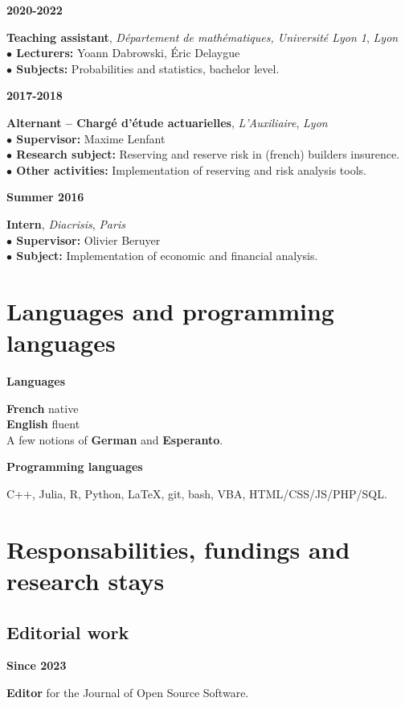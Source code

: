 \documentclass[a4paper,11pt]{article}
\newcommand{\tabcv}[2]{
\begin{minipage}[t]{0.12\linewidth}
\textbf{\footnotesize #1}
\end{minipage}\hfill
\begin{minipage}[t]{0.85\linewidth}
#2
\end{minipage}
\vspace{1em}
}
\begin{document}
\begin{flushleft}
\tabcv{2020-2022}{
\textbf{Teaching assistant}, \textit{Département de mathématiques, Université Lyon 1}, \textit{Lyon}\\[0.5em]
{\footnotesize
\textbf{$\bullet$ Lecturers:} Yoann Dabrowski, Éric Delaygue\\
\textbf{$\bullet$ Subjects:} Probabilities and statistics, bachelor level.\\
}
}

\tabcv{2017-2018}{
\textbf{Alternant -- Chargé d'étude actuarielles}, \textit{L'Auxiliaire}, \textit{Lyon}\\[0.5em]
{\footnotesize
\textbf{$\bullet$ Supervisor:} Maxime Lenfant\\
\textbf{$\bullet$ Research subject:} Reserving and reserve risk in (french) builders insurence.\\
\textbf{$\bullet$ Other activities:} Implementation of reserving and risk analysis tools.\\
}
}


\tabcv{Summer 2016}{
\textbf{Intern}, \textit{Diacrisis}, \textit{Paris}\\[0.5em]
{\footnotesize
\textbf{$\bullet$ Supervisor:} Olivier Beruyer\\
\textbf{$\bullet$ Subject:} Implementation of economic and financial analysis. \\
}
}

\end{flushleft}

\section{Languages and programming languages}
\tabcv{Languages}{
\textbf{French} native\\ 
\textbf{English} fluent\\ 
A few notions of \textbf{German} and \textbf{Esperanto}.\\
}
\tabcv{Programming languages}{
C++, Julia, R, Python, \LaTeX, git, bash, VBA, HTML/CSS/JS/PHP/SQL.\\
}

\section{Responsabilities, fundings and research stays}

\subsection{Editorial work}
\tabcv{Since 2023}{\textbf{Editor} for the {{Journal of Open Source Software}}.}
\end{document}
